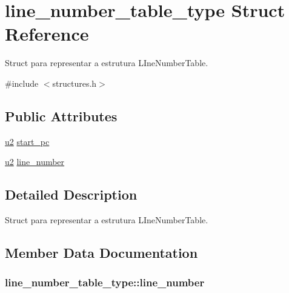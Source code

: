 \hypertarget{structline__number__table__type}{}\section{line\+\_\+number\+\_\+table\+\_\+type Struct Reference}
\label{structline__number__table__type}


Struct para representar a estrutura L\+Ine\+Number\+Table.  




{\ttfamily \#include $<$structures.\+h$>$}

\subsection*{Public Attributes}
\begin{DoxyCompactItemize}
\item 
\hyperlink{structures_8h_a55ef8d87fd202b8417704c089899c5b9}{u2} \hyperlink{structline__number__table__type_ac0e263d3f0484fb8bea365e8b87398e1}{start\+\_\+pc}
\item 
\hyperlink{structures_8h_a55ef8d87fd202b8417704c089899c5b9}{u2} \hyperlink{structline__number__table__type_ac9f2fe3d86343b8eb013f969fa31314c}{line\+\_\+number}
\end{DoxyCompactItemize}


\subsection{Detailed Description}
Struct para representar a estrutura L\+Ine\+Number\+Table. 

\subsection{Member Data Documentation}
\subsubsection[{\texorpdfstring{line\+\_\+number}{line_number}}]{ line\+\_\+number\+\_\+table\+\_\+type\+::line\+\_\+number}\hypertarget{structline__number__table__type_ac9f2fe3d86343b8eb013f969fa31314c}{}\label{structline__number__table__type_ac9f2fe3d86343b8eb013f969fa31314c}

